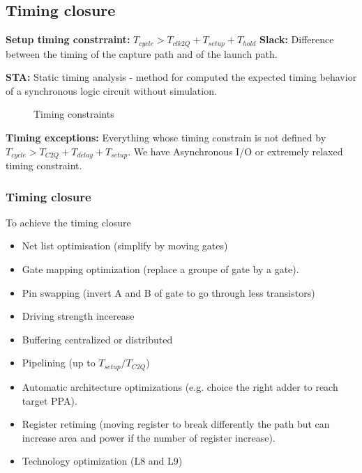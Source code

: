 \subsection{Timing closure}
\textbf{Setup timing constrraint:}
\(
T_{cycle} > T_{clk2Q} + T_{setup} + T_{hold}
\)
\textbf{Slack:} Difference between the timing of the capture path and of the launch path.

\textbf{STA:} Static timing analysis - method for computed the expected timing behavior of a synchronous logic circuit without simulation.


\begin{figure}[!ht]
  \centering
  \caption{Timing constraints}
  \label{Tikz:}
  \end{figure}

  \textbf{Timing exceptions:} Everything whose timing constrain is not defined by \(T_{cycle} > T_{C2Q} + T_{delay} + T_{setup}\). We have Asynchronous I/O or extremely relaxed timing constraint.


  \subsubsection{Timing closure}
  To achieve the timing closure
  \begin{itemize}
    \item Net list optimisation (simplify by moving gates)
  \item Gate mapping optimization (replace a groupe of gate by a gate).
  \item Pin swapping (invert A and B of gate to go through less transistors)
  \item Driving strength incerease
  \item Buffering centralized or distributed
  \item Pipelining (up to \(T_{setup} / T_{C2Q}\))
  \item Automatic architecture optimizations (e.g. choice the right adder to reach target PPA).
  \item Register retiming (moving register to break differently the path but can increase area and power if the number of register increase).
  \item Technology optimization (L8 and L9)
  \end{itemize}
